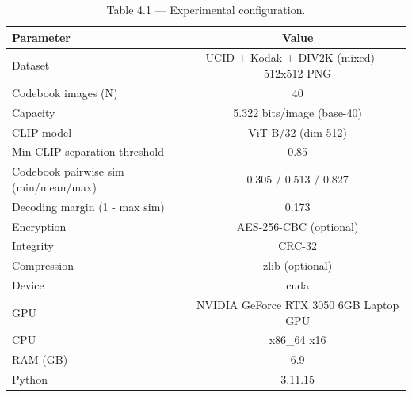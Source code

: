 \begin{table}[htbp]
\centering
\caption{Table 4.1 — Experimental configuration.}
\label{tab:table_4_1_setup}
\begin{tabular}{lc}
\hline
Parameter & Value \\
\hline
Dataset & UCID + Kodak + DIV2K (mixed) — 512x512 PNG \\
Codebook images (N) & 40 \\
Capacity & 5.322 bits/image (base-40) \\
CLIP model & ViT-B/32 (dim 512) \\
Min CLIP separation threshold & 0.85 \\
Codebook pairwise sim (min/mean/max) & 0.305 / 0.513 / 0.827 \\
Decoding margin (1 - max sim) & 0.173 \\
Encryption & AES-256-CBC (optional) \\
Integrity & CRC-32 \\
Compression & zlib (optional) \\
Device & cuda \\
GPU & NVIDIA GeForce RTX 3050 6GB Laptop GPU \\
CPU & x86_64 x16 \\
RAM (GB) & 6.9 \\
Python & 3.11.15 \\
\hline
\end{tabular}
\end{table}
